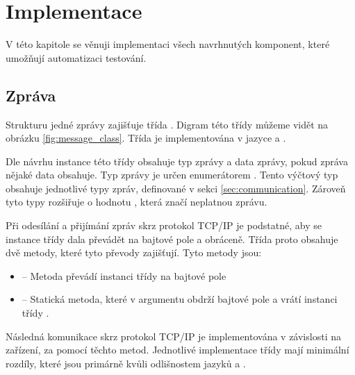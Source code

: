 \chapter{Implementace}\label{chap:implementation}

V této kapitole se věnuji implementaci všech navrhnutých komponent, které umožňují automatizaci testování.

\section{Zpráva}
Strukturu jedné zprávy zajišťuje třída . Digram této třídy můžeme vidět na obrázku \ref{fig:message_class}. Třída  je implementována v jazyce \csharp{} a \cpp{}.

Dle návrhu instance této třídy obsahuje typ zprávy a data zprávy, pokud zpráva nějaké data obsahuje. Typ zprávy je určen enumerátorem . Tento výčtový typ obsahuje jednotlivé typy zpráv, definované v sekci \ref{sec:communication}. Zároveň tyto typy rozšiřuje o hodnotu , která značí neplatnou zprávu.

Při odesílání a přijímání zpráv skrz protokol TCP/IP je podstatné, aby se instance třídy dala převádět na bajtové pole a obráceně. Třída  proto obsahuje dvě metody, které tyto převody zajišťují. Tyto metody jsou:

\begin{itemize}
    \item {} -- Metoda převádí instanci třídy  na bajtové pole
    \item {} -- Statická metoda, které v argumentu obdrží bajtové pole a vrátí instanci třídy .
\end{itemize}

Následná komunikace skrz protokol TCP/IP je implementována v závislosti na zařízení, za pomocí těchto metod. Jednotlivé implementace třídy  mají minimální rozdíly, které jsou primárně kvůli odlišnostem jazyků \csharp{} a \cpp{}.

